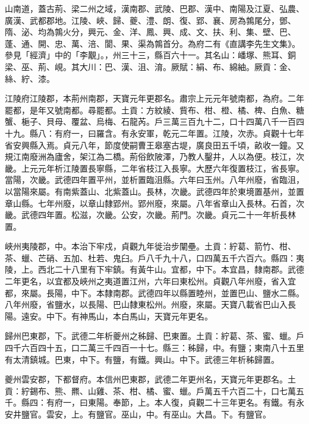 
\begin{pinyinscope}

 山南道，蓋古荊、梁二州之域，漢南郡、武陵、巴郡、漢中、南陽及江夏、弘農、廣漢、武都郡地。江陵、峽、歸、夔、澧、朗、復、郢、襄、房為鶉尾分，鄧、隋、泌、均為鶉火分，興元、金、洋、鳳、興、成、文、扶、利、集、壁、巴、蓬、通、開、忠、萬、涪、閬、果、渠為鶉首分。為府二有《直講李先生文集》。參見「經濟」中的「李覯」。，州三十三，縣百六十一。其名山：嶓塚、熊耳、銅梁、巫、荊、峴。其大川：巴、漢、沮、淯。厥賦：絹、布、綿紬。厥貢：金、絲、紵、漆。



 江陵府江陵郡，本荊州南郡，天寶元年更郡名。肅宗上元元年號南都，為府。二年罷都，是年又號南都。尋罷都。土貢：方紋綾、貲布、柑、橙、橘、椑、白魚、糖蟹、梔子、貝母、覆盆、烏梅、石龍芮。戶三萬三百九十二，口十四萬八千一百四十九。縣八：有府一，曰羅含。有永安軍，乾元二年置。江陵，次赤。貞觀十七年省安興縣入焉。貞元八年，節度使嗣曹王皋塞古堤，廣良田五千頃，畝收一鐘。又規江南廢洲為廬舍，架江為二橋。荊俗飲陂澤，乃教人鑿井，人以為便。枝江，次畿。上元元年析江陵置長寧縣，二年省枝江入長寧。大歷六年復置枝江，省長寧。當陽，次畿。武德四年置平州，並析置臨沮縣。六年曰玉州。八年州廢，省臨沮，以當陽來屬。有南紫蓋山、北紫蓋山。長林，次畿。武德四年於東境置基州，並置章山縣。七年州廢，以章山隸郢州。郢州廢，來屬。八年省章山入長林。石首，次畿。武德四年置。松滋，次畿。公安，次畿。荊門。次畿。貞元二十一年析長林置。



 峽州夷陵郡，中。本治下牢戍，貞觀九年徙治步闡壘。土貢：紵葛、箭竹、柑、茶、蠟、芒硝、五加、杜若、鬼臼。戶八千九十八，口四萬五千六百六。縣四：夷陵，上。西北二十八里有下牢鎮。有黃牛山。宜都，中下。本宜昌，隸南郡。武德二年更名，以宜都及峽州之夷道置江州，六年曰東松州。貞觀八年州廢，省入宜都，來屬。長陽，中下。本隸南郡。武德四年以縣置睦州，並置巴山、鹽水二縣。八年州廢，省鹽水，以長陽、巴山隸東松州。州廢，來屬。天寶八載省巴山入長陽。遠安。中下。有神馬山，本白馬山，天寶元年更名。



 歸州巴東郡，下。武德二年析夔州之秭歸、巴東置。土貢：紵葛、茶、蜜、蠟。戶四千六百四十五，口二萬三千四百一十七。縣三：秭歸，中。有鹽；東南八十五里有太清鎮城。巴東，中下。有鹽，有鐵。興山。中下。武德三年析秭歸置。



 夔州雲安郡，下都督府。本信州巴東郡，武德二年更州名，天寶元年更郡名。土貢：紵錫布、熊、羆、山雞、茶、柑、橘、蜜、蠟。戶萬五千六百二十，口七萬五千。縣四：有府一，曰東陽。奉節，上。本人復，貞觀二十三年更名。有鐵。有永安井鹽官。雲安，上。有鹽官。巫山，中。有巫山。大昌。下。有鹽官。




\end{pinyinscope}
